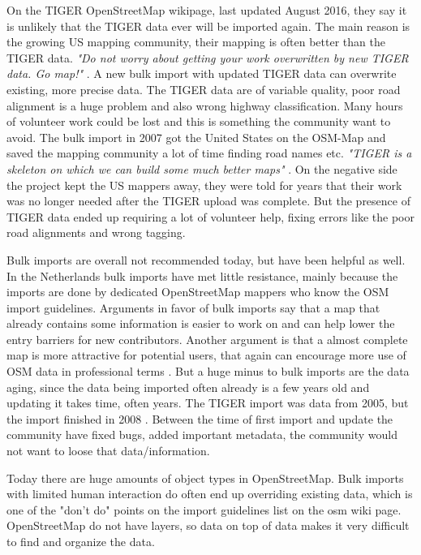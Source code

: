 On the TIGER OpenStreetMap wikipage, last updated August 2016, they say it is unlikely that the TIGER data ever will be imported again. The main reason is the growing US mapping community, their mapping is often better than the TIGER data. \textit{"Do not worry about getting your work overwritten by new TIGER data. Go map!"}  \cite{WikiOSMTIGER2007}. A new bulk import with updated TIGER data can overwrite existing, more precise data. The TIGER data are of variable quality, poor road alignment is a huge problem and also wrong highway classification. Many hours of volunteer work could be lost and this is something the community want to avoid. The bulk import in 2007 got the United States on the OSM-Map and saved the mapping community a lot of time finding road names etc. \textit{"TIGER is a skeleton on which we can build some much better maps"} \cite{Willis2007}. On the negative side the project kept the US mappers away, they were told for years that their work was no longer needed after the TIGER upload was complete. But the presence of TIGER data ended up requiring a lot of volunteer help, fixing errors like the poor road alignments and wrong tagging. 

Bulk imports are overall not recommended today, but have been helpful as well. In the Netherlands bulk imports have met little resistance, mainly because the imports are done by dedicated OpenStreetMap mappers who know the OSM import guidelines.  Arguments in favor of bulk imports say that a map that already contains some information is easier to work on and can help lower the entry barriers for new contributors. Another argument is that a almost complete map is more attractive for potential users, that again can encourage more use of OSM data in professional terms \cite{Exelvan2010}. But a huge minus to bulk imports are the data aging, since the data being imported often already is a few years old and updating it takes time, often years. The TIGER import was data from 2005, but the import finished in 2008 \cite{Zielstra2013}. Between the time of first import and update the community have fixed bugs, added important metadata, the community would not want to loose that data/information. 

Today there are huge amounts of object types in OpenStreetMap. Bulk imports with limited human interaction do often end up overriding existing data, which is one of the "don't do" points on the import guidelines list on the osm wiki page. OpenStreetMap do not have layers, so data on top of data makes it very difficult to find and organize the data.    

